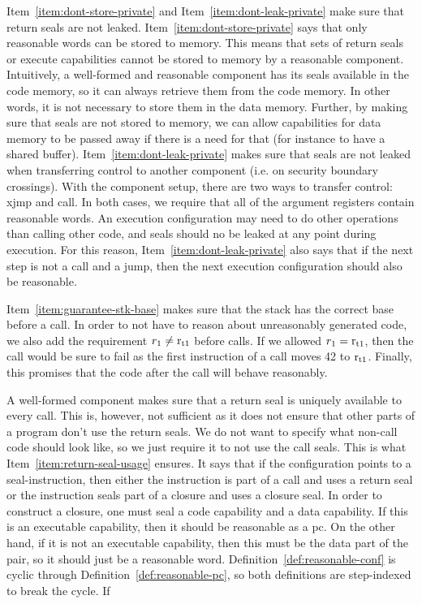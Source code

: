 \documentclass[acmsmall,screen]{acmart}\settopmatter{}
\newenvironment{jversion}%
    {\color{OliveGreen}}{}
\begin{document}
\begin{jversion}
Item~\ref{item:dont-store-private} and Item~\ref{item:dont-leak-private} make sure that return seals are not leaked.
Item~\ref{item:dont-store-private} says that only reasonable words can be stored to memory.
This means that sets of return seals or execute capabilities cannot be stored to memory by a reasonable component.
Intuitively, a well-formed and reasonable component has its seals available in the code memory, so it can always retrieve them from the code memory.
In other words, it is not necessary to store them in the data memory.
Further, by making sure that seals are not stored to memory, we can allow capabilities for data memory to be passed away if there is a need for that (for instance to have a shared buffer).
Item~\ref{item:dont-leak-private} makes sure that seals are not leaked when transferring control to another component (i.e. on security boundary crossings).
With the component setup, there are two ways to transfer control: xjmp and call.
In both cases, we require that all of the argument registers contain reasonable words.
An execution configuration may need to do other operations than calling other code, and seals should no be leaked at any point during execution.
For this reason, Item~\ref{item:dont-leak-private} also says that if the next step is not a call and a jump, then the next execution configuration should also be reasonable.

Item~\ref{item:guarantee-stk-base} makes sure that the stack has the correct base before a call.
In order to not have to reason about unreasonably generated code, we also add the requirement $r_1 \neq \mathrm{r}_\mathrm{t1}$ before calls.
If we allowed $r_1=\mathrm{r}_\mathrm{t1}$, then the call would be sure to fail as the first instruction of a call moves 42 to $\mathrm{r}_\mathrm{t1}$.
Finally, this promises that the code after the call will behave reasonably.

A well-formed component makes sure that a return seal is uniquely available to every call.
This is, however, not sufficient as it does not ensure that other parts of a program don't use the return seals.
We do not want to specify what non-call code should look like, so we just require it to not use the call seals.
This is what Item~\ref{item:return-seal-usage} ensures.
It says that if the configuration points to a seal-instruction, then either the instruction is part of a call and uses a return seal or the instruction seals part of a closure and uses a closure seal.
In order to construct a closure, one must seal a code capability and a data capability.
If this is an executable capability, then it should be reasonable as a pc.
On the other hand, if it is not an executable capability, then this must be the data part of the pair, so it should just be a reasonable word.
Definition~\ref{def:reasonable-conf} is cyclic through Definition~\ref{def:reasonable-pc}, so both definitions are step-indexed to break the cycle. If 


\end{jversion}
\end{document}

